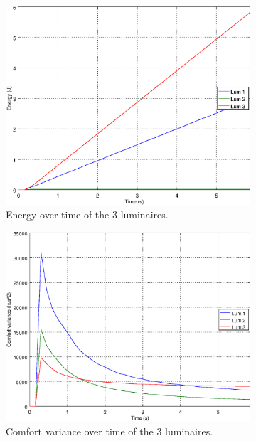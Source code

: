 \begin{figure}[ht]
    \centering
    \begin{subfigure}[t]{0.32\textwidth}
    \centering
    \includegraphics[width=.95\textwidth]{img/e_closed_o101}
    \caption{Energy over time of the 3 luminaires.}
    \label{fig:e_closed_o101}
    \end{subfigure}
    \begin{subfigure}[t]{0.32\textwidth}
    \centering
    \includegraphics[width=.95\textwidth]{img/f_closed_o101}
    \caption{Comfort variance over time of the 3 luminaires.}
    \label{fig:f_closed_o101}
    \end{subfigure}
    \begin{subfigure}[t]{0.32\textwidth}

\end{subfigure}
\end{figure}

